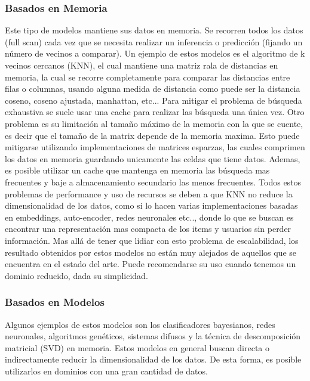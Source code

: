 \documentclass[11pt,a4paper,twoside]{thesis}
\begin{document}
 \subsubsection{Basados en Memoria} 
 
 Este tipo de modelos mantiene sus datos en memoria. Se recorren todos los datos (full scan) cada vez que se necesita realizar un inferencia o predicción (fijando un número de vecinos a comparar). Un ejemplo de estos modelos es el algoritmo de k vecinos cercanos (KNN), el cual mantiene una matriz rala de distancias en memoria, la cual se recorre completamente para comparar las distancias entre filas o columnas, usando alguna medida de distancia como puede ser la distancia coseno, coseno ajustada, manhattan, etc... Para mitigar el problema de búsqueda exhaustiva se suele usar una cache para realizar las búsqueda una única vez. Otro problema es su limitación al tamaño máximo de la memoria con la que se cuente, es decir que el tamaño de la matrix depende de la memoria maxima. Esto puede mitigarse utilizando implementaciones de matrices esparzas, las cuales comprimen los datos en memoria guardando unicamente las celdas que tiene datos. Ademas, es posible utilizar un cache que mantenga en memoria las búsqueda mas frecuentes y baje a almacenamiento secundario las menos frecuentes. Todos estos problemas de performance y uso de recursos se deben a que KNN no reduce la dimensionalidad de los datos, como si lo hacen varias implementaciones basadas en embeddings, auto-encoder, redes neuronales etc.., donde lo que se buscan es encontrar una representación mas compacta de los items y usuarios sin perder información. Mas allá de tener que lidiar con esto problema de escalabilidad, los resultado obtenidos por estos modelos no están muy alejados de aquellos que se encuentra en el estado del arte. Puede recomendarse su uso cuando tenemos un dominio reducido, dada su simplicidad. 

 \subsubsection{Basados en Modelos}
 
Algunos ejemplos de estos modelos son los clasificadores bayesianos, redes neuronales, algoritmos genéticos, sistemas difusos y la técnica de descomposición matricial (SVD) en memoria. Estos modelos en general buscan directa o indirectamente reducir la dimensionalidad de los datos. De esta forma, es posible utilizarlos en dominios con una gran cantidad de datos.
\end{document}
